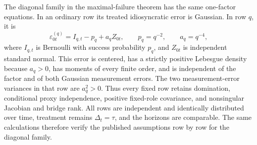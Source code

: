 The diagonal family in the maximal-failure theorem has the same one-factor equations.  In an ordinary row its treated idiosyncratic error is Gaussian.  In row \(q\), it is
\[
 \varepsilon_{0t}^{(q)}
 =I_{q,t}-p_q+a_qZ_{0t},
 \qquad p_q=q^{-2},\qquad a_q=q^{-4},
\]
where \(I_{q,t}\) is Bernoulli with success probability \(p_q\), and \(Z_{0t}\) is independent standard normal.  This error is centered, has a strictly positive Lebesgue density because \(a_q>0\), has moments of every finite order, and is independent of the factor and of both Gaussian measurement errors.  The two measurement-error variances in that row are \(a_q^2>0\).  Thus every fixed row retains domination, conditional proxy independence, positive fixed-role covariance, and nonsingular Jacobian and bridge rank.  All rows are independent and identically distributed over time, treatment remains \(\Delta_t=\tau\), and the horizons are comparable.  The same calculations therefore verify the published assumptions row by row for the diagonal family.

